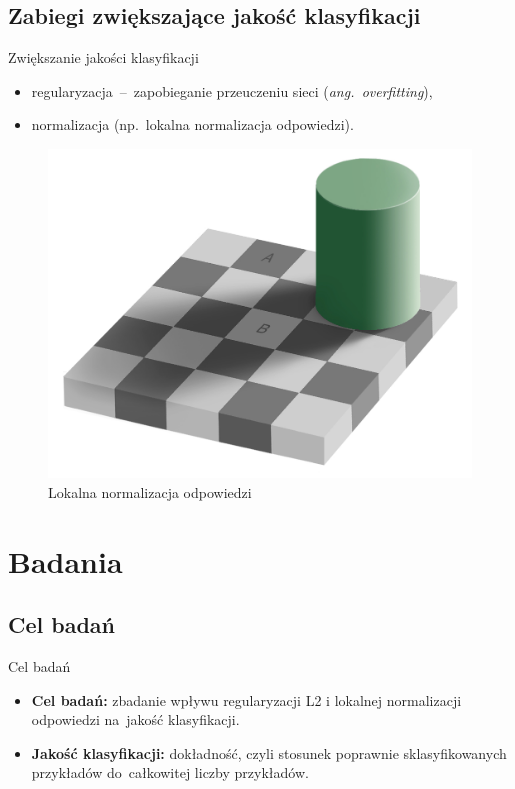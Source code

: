 \documentclass[xcolor=dvipsnames]{beamer}
\begin{document}
\subsection{Zabiegi zwiększające jakość klasyfikacji}
\begin{frame}{Zwiększanie jakości klasyfikacji}
    \begin{minipage}[t]{0.48\linewidth}
        \begin{itemize}
            \item regularyzacja~--~zapobieganie przeuczeniu sieci (\textit{ang.~overfitting}),
            \item normalizacja (np.~lokalna normalizacja odpowiedzi).
        \end{itemize}
	\end{minipage}%
	\hfill
	\begin{minipage}[t]{0.48\linewidth}
        \begin{figure}
            \includegraphics[width=\linewidth, height=0.7\textheight, keepaspectratio] {img/chess-illusion.png}
            \caption{Lokalna normalizacja odpowiedzi}
        \end{figure}
	\end{minipage}
\end{frame}

\section{Badania}
\subsection{Cel badań}
\begin{frame}{Cel badań}
	\begin{itemize}
	    \item \textbf{Cel badań:} zbadanie wpływu regularyzacji L2 i lokalnej normalizacji odpowiedzi na~jakość
	    klasyfikacji.
	    \item \textbf{Jakość klasyfikacji:} dokładność, czyli stosunek poprawnie sklasyfikowanych przykładów
	           do~całkowitej liczby przykładów.
    \end{itemize}
\end{frame}
\end{document}

